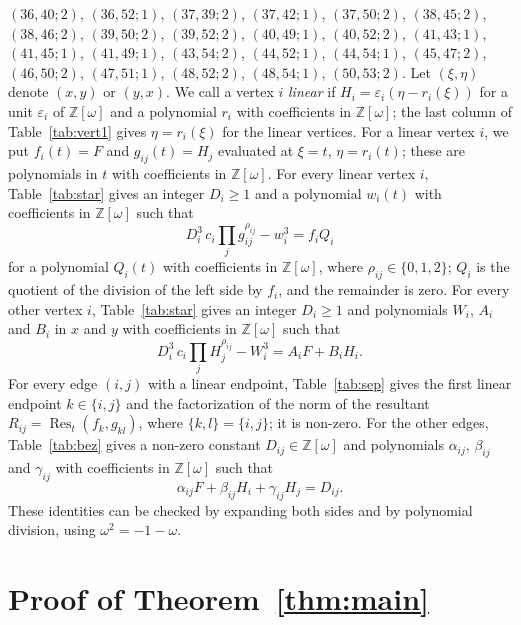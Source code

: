 \documentclass[11pt]{article}
\newcommand{\Z}{\mathbb{Z}}
\begin{document}
$(36,40;2)$, $(36,52;1)$, $(37,39;2)$, $(37,42;1)$, $(37,50;2)$, $(38,45;2)$, $(38,46;2)$, $(39,50;2)$, $(39,52;2)$, $(40,49;1)$, $(40,52;2)$, $(41,43;1)$, $(41,45;1)$, $(41,49;1)$, $(43,54;2)$, $(44,52;1)$, $(44,54;1)$, $(45,47;2)$, $(46,50;2)$, $(47,51;1)$, $(48,52;2)$, $(48,54;1)$, $(50,53;2)$.
Let $(\xi,\eta)$ denote $(x,y)$ or $(y,x)$. We call a vertex $i$ \emph{linear} if $H_i=\varepsilon_i(\eta-r_i(\xi))$ for a unit $\varepsilon_i$ of $\Z[\omega]$ and a polynomial $r_i$ with coefficients in $\Z[\omega]$; the last column of Table~\ref{tab:vert1} gives $\eta=r_i(\xi)$ for the linear vertices. For a linear vertex $i$, we put $f_i(t)=F$ and $g_{ij}(t)=H_j$ evaluated at $\xi=t$, $\eta=r_i(t)$; these are polynomials in $t$ with coefficients in $\Z[\omega]$.
For every linear vertex $i$, Table~\ref{tab:star} gives an integer $D_i\geq1$ and a polynomial $w_i(t)$ with coefficients in $\Z[\omega]$ such that
\begin{equation}\label{eq:starlin}
D_i^3\,c_i\prod_jg_{ij}^{\rho_{ij}}-w_i^3=f_iQ_i
\end{equation}
for a polynomial $Q_i(t)$ with coefficients in $\Z[\omega]$, where $\rho_{ij}\in\{0,1,2\}$; $Q_i$ is the quotient of the division of the left side by $f_i$, and the remainder is zero.
For every other vertex $i$, Table~\ref{tab:star} gives an integer $D_i\geq1$ and polynomials $W_i$, $A_i$ and $B_i$ in $x$ and $y$ with coefficients in $\Z[\omega]$ such that
\begin{equation}\label{eq:star}
D_i^3\,c_i\prod_jH_j^{\rho_{ij}}-W_i^3=A_iF+B_iH_i.
\end{equation}
For every edge $(i,j)$ with a linear endpoint, Table~\ref{tab:sep} gives the first linear endpoint $k\in\{i,j\}$ and the factorization of the norm of the resultant $R_{ij}=\operatorname{Res}_t(f_k,g_{kl})$, where $\{k,l\}=\{i,j\}$; it is non-zero.
For the other edges, Table~\ref{tab:bez} gives a non-zero constant $D_{ij}\in\Z[\omega]$ and polynomials $\alpha_{ij}$, $\beta_{ij}$ and $\gamma_{ij}$ with coefficients in $\Z[\omega]$ such that
\begin{equation}\label{eq:sep}
\alpha_{ij}F+\beta_{ij}H_i+\gamma_{ij}H_j=D_{ij}.
\end{equation}
These identities can be checked by expanding both sides and by polynomial division, using $\omega^2=-1-\omega$.

\section{Proof of Theorem~\ref{thm:main}}
\end{document}
